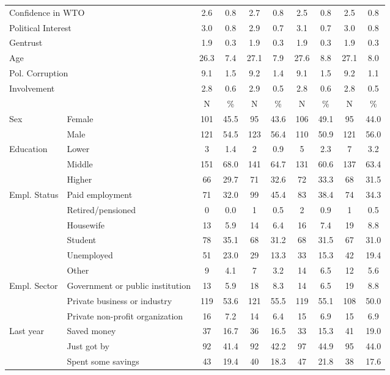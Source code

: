 \begin{table}[!htbp]
{\begin{tabular}[t]{llcccccccc}
\multicolumn{2}{l}{Confidence in WTO }  & 2.6 & 0.8 & 2.7 & 0.8 & 2.5 & 0.8 & 2.5 & 0.8\\
\multicolumn{2}{l}{Political Interest }  & 3.0 & 0.8 & 2.9 & 0.7 & 3.1 & 0.7 & 3.0 & 0.8\\
\multicolumn{2}{l}{Gentrust }  & 1.9 & 0.3 & 1.9 & 0.3 & 1.9 & 0.3 & 1.9 & 0.3\\
\multicolumn{2}{l}{Age }  & 26.3 & 7.4 & 27.1 & 7.9 & 27.6 & 8.8 & 27.1 & 8.0\\
\multicolumn{2}{l}{Pol. Corruption }  & 9.1 & 1.5 & 9.2 & 1.4 & 9.1 & 1.5 & 9.2 & 1.1\\
\multicolumn{2}{l}{Involvement }  & 2.8 & 0.6 & 2.9 & 0.5 & 2.8 & 0.6 & 2.8 & 0.5\\
\midrule
 &  & N & \% & N & \% & N & \% & N & \%\\
\midrule
Sex & Female & 101 & 45.5 & 95 & 43.6 & 106 & 49.1 & 95 & 44.0\\
 & Male & 121 & 54.5 & 123 & 56.4 & 110 & 50.9 & 121 & 56.0\\
Education & Lower & 3 & 1.4 & 2 & 0.9 & 5 & 2.3 & 7 & 3.2\\
 & Middle & 151 & 68.0 & 141 & 64.7 & 131 & 60.6 & 137 & 63.4\\
 & Higher & 66 & 29.7 & 71 & 32.6 & 72 & 33.3 & 68 & 31.5\\
Empl. Status & Paid employment & 71 & 32.0 & 99 & 45.4 & 83 & 38.4 & 74 & 34.3\\
 & Retired/pensioned & 0 & 0.0 & 1 & 0.5 & 2 & 0.9 & 1 & 0.5\\
 & Housewife & 13 & 5.9 & 14 & 6.4 & 16 & 7.4 & 19 & 8.8\\
 & Student & 78 & 35.1 & 68 & 31.2 & 68 & 31.5 & 67 & 31.0\\
 & Unemployed & 51 & 23.0 & 29 & 13.3 & 33 & 15.3 & 42 & 19.4\\
 & Other & 9 & 4.1 & 7 & 3.2 & 14 & 6.5 & 12 & 5.6\\
Empl. Sector & Government or public institution & 13 & 5.9 & 18 & 8.3 & 14 & 6.5 & 19 & 8.8\\
 & Private business or industry & 119 & 53.6 & 121 & 55.5 & 119 & 55.1 & 108 & 50.0\\
 & Private non-profit organization & 16 & 7.2 & 14 & 6.4 & 15 & 6.9 & 15 & 6.9\\
Last year & Saved money & 37 & 16.7 & 36 & 16.5 & 33 & 15.3 & 41 & 19.0\\
 & Just got by & 92 & 41.4 & 92 & 42.2 & 97 & 44.9 & 95 & 44.0\\
 & Spent some savings & 43 & 19.4 & 40 & 18.3 & 47 & 21.8 & 38 & 17.6\\

\end{tabular}}
\end{table}

